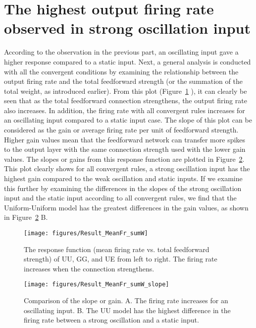 \section[The Response Function]{The highest output firing rate observed in strong oscillation input}
 According to the observation in the previous part, an oscillating input gave a higher response compared to a static input. Next, a general analysis is conducted with all the convergent conditions by examining the relationship between the output firing rate and the total feedforward strength (or the summation of the total weight, as introduced earlier). From this plot (Figure~\ref{fig:ResFun} ), it can clearly be seen that as the total feedforward connection strengthens, the output firing rate also increases.
 In addition, the firing rate with all convergent rules increases for an oscillating input compared to a static input case. The slope of this plot can be considered as the gain or average firing rate per unit of feedforward strength. Higher gain values mean that the feedforward network can transfer more spikes to the output layer with the same connection strength used with the lower gain values. The slopes or gains from this response function are plotted in Figure~\ref{fig:ResFunDiff}. This plot clearly shows for all convergent rules, a strong oscillation input has the highest gain compared to the weak oscillation and static inputs. If we examine this further by examining the differences in the slopes of the strong oscillation input and the static input according to all convergent rules, we find that the Uniform-Uniform model has the greatest differences in the gain values, as shown in Figure~\ref{fig:ResFunDiff} B. 


\begin{figure}[!h]
	\centering
	\texttt{[image: figures/Result\_MeanFr\_sumW]}
	\caption[The response function]{The response function (mean firing rate vs. total feedforward strength) of UU, GG, and UE from left to right. The firing rate increases when the connection strengthens.}
	\label{fig:ResFun}
\end{figure}


\begin{figure}[!h]
	\centering
	\texttt{[image: figures/Result\_MeanFr\_sumW\_slope]}
	\caption[Comparison of the slope or gain]{Comparison of the slope or gain. A. The firing rate increases for an oscillating input. B. The UU model has the highest difference in the firing rate between a strong oscillation and a static input.}
	\label{fig:ResFunDiff}
\end{figure}


